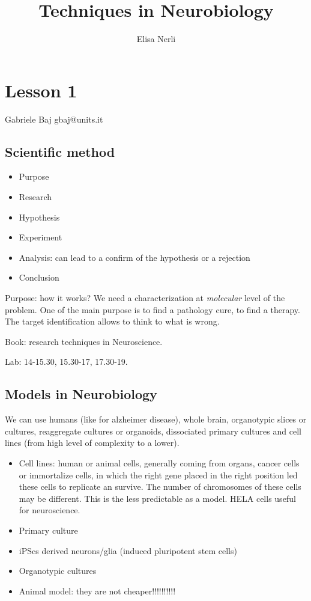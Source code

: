 \documentclass[a4paper, 12pt]{book}
\begin{document}
\author{Elisa Nerli}
\title{Techniques in Neurobiology}
\maketitle
\newpage
\tableofcontents
\newpage


\chapter{Lesson 1}
Gabriele Baj gbaj@units.it
\section{Scientific method}

\begin{itemize}
\item{Purpose}
\item{Research}
\item{Hypothesis}
\item{Experiment}
\item{Analysis: can lead to a confirm of the hypothesis or a rejection}
\item{Conclusion}
\end{itemize}

Purpose: how it works? We need a characterization at \emph{molecular} level of the problem. One of the main purpose is to find a pathology cure, to find a therapy. The target identification allows to think to what is wrong. 

Book: research techniques in Neuroscience.

Lab: 14-15.30, 15.30-17, 17.30-19.
\section{Models in Neurobiology}
We can use humans (like for alzheimer disease), whole brain, organotypic slices or cultures, reaggregate cultures or organoids, dissociated primary cultures and cell lines (from high level of complexity to a lower).
\begin{itemize}
\item{Cell lines: human or animal cells, generally coming from organs, cancer cells or immortalize cells, in which the right gene placed in the right position led these cells to replicate an survive. The number of chromosomes of these cells may be different. This is the less predictable as a model. HELA cells useful for neuroscience.}
\item{Primary culture} 
\item{iPScs derived neurons/glia (induced pluripotent stem cells)}
\item{Organotypic cultures}
\item{Animal model: they are not cheaper!!!!!!!!!!}
\end{itemize}
\end{document}
